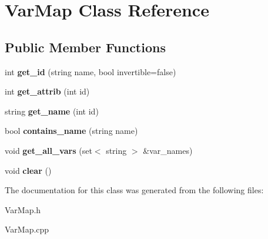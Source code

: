 \hypertarget{classVarMap}{\section{\-Var\-Map \-Class \-Reference}
\label{classVarMap}
}
\subsection*{\-Public \-Member \-Functions}
\begin{DoxyCompactItemize}
\item 
\hypertarget{classVarMap_a642547670d6ab8148b9bbf638f953137}{int {\bfseries get\-\_\-id} (string name, bool invertible=false)}\label{classVarMap_a642547670d6ab8148b9bbf638f953137}

\item 
\hypertarget{classVarMap_a0748479f669f0977b8e3a76db1aa5d2b}{int {\bfseries get\-\_\-attrib} (int id)}\label{classVarMap_a0748479f669f0977b8e3a76db1aa5d2b}

\item 
\hypertarget{classVarMap_aa237b264636a54cb90c9eea19e3c6704}{string {\bfseries get\-\_\-name} (int id)}\label{classVarMap_aa237b264636a54cb90c9eea19e3c6704}

\item 
\hypertarget{classVarMap_ab313eba9e018928629ade3ee27af6626}{bool {\bfseries contains\-\_\-name} (string name)}\label{classVarMap_ab313eba9e018928629ade3ee27af6626}

\item 
\hypertarget{classVarMap_aafc459209a7e690c29f34f2bf3608125}{void {\bfseries get\-\_\-all\-\_\-vars} (set$<$ string $>$ \&var\-\_\-names)}\label{classVarMap_aafc459209a7e690c29f34f2bf3608125}

\item 
\hypertarget{classVarMap_ada11009e999614753d6eccb11f5ae5e3}{void {\bfseries clear} ()}\label{classVarMap_ada11009e999614753d6eccb11f5ae5e3}

\end{DoxyCompactItemize}


\-The documentation for this class was generated from the following files\-:\begin{DoxyCompactItemize}
\item 
\-Var\-Map.\-h\item 
\-Var\-Map.\-cpp\end{DoxyCompactItemize}
